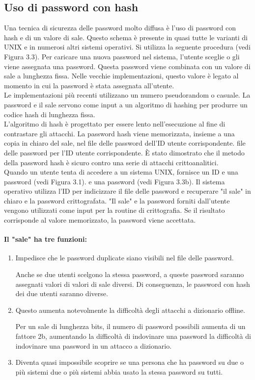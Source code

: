 \subsection{Uso di password con hash}
Una tecnica di sicurezza delle password molto diffusa è l'uso di password con hash e di un valore di sale. Questo schema è presente in quasi tutte le varianti di UNIX e in numerosi altri sistemi operativi. Si utilizza la seguente procedura (vedi Figura 3.3). Per caricare una nuova password nel sistema, l'utente sceglie o gli viene assegnata una password. Questa password viene combinata con un valore di sale a lunghezza fissa. Nelle vecchie implementazioni, questo valore è legato al momento in cui la password è stata assegnata all'utente. 
\\
Le implementazioni più recenti utilizzano un numero pseudorandom o casuale. La password e il sale servono come input a un algoritmo di hashing per produrre un codice hash di lunghezza fissa.
\\
L'algoritmo di hash è progettato per essere lento nell'esecuzione al fine di contrastare gli attacchi. La password
hash viene memorizzata, insieme a una copia in chiaro del sale, nel file delle password dell'ID utente corrispondente.
file delle password per l'ID utente corrispondente. È stato dimostrato che il metodo della password hash è sicuro contro una serie di attacchi crittoanalitici.
\\
Quando un utente tenta di accedere a un sistema UNIX, fornisce un ID e una password (vedi Figura 3.1). e una password (vedi Figura 3.3b). Il sistema operativo utilizza l'ID per indicizzare il file delle password e recuperare "il sale" in chiaro e la password crittografata. "Il sale" e la password forniti dall'utente vengono utilizzati come input per la routine di crittografia. Se il risultato corrisponde al valore memorizzato, la password viene accettata.
\newpage
\paragraph{Il "sale" ha tre funzioni:}
\begin{enumerate}
    \item Impedisce che le password duplicate siano visibili nel file delle password. 
    
    Anche se due utenti scelgono la stessa password, a queste password saranno assegnati valori di valori di sale diversi. Di conseguenza, le password con hash dei due utenti saranno diverse.
    
    \item Questo aumenta notevolmente la difficoltà degli attacchi a dizionario offline. 
    
    Per un sale di lunghezza bits, il numero di password possibili aumenta di un fattore 2b, aumentando la difficoltà di indovinare una password la difficoltà di indovinare una password in un attacco a dizionario.
    
    \item Diventa quasi impossibile scoprire se una persona che ha password su due o più sistemi due o più sistemi abbia usato la stessa password su tutti.
    
\end{enumerate}

